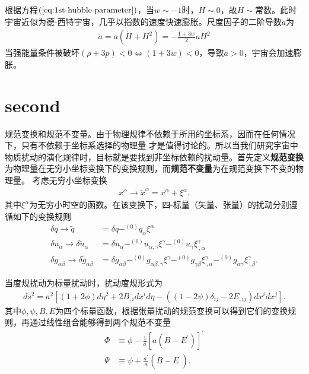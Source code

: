 \documentclass{article}
\begin{document}
  根据方程$(\ref{eq:1st-hubble-parameter})$，当$w\sim -1$时，$\dot{H}\sim
  0$，故$H\sim
  \text{常数}$。此时宇宙近似为德-西特宇宙，几乎以指数的速度快速膨胀。尺度因子的二阶导数$\ddot{a}$为
  \begin{align}
    \label{eq:2nd-scale-factor}
    \ddot{a}=a{\left(\dot{H}+H^2\right)}=-\frac{1+3w}{2}aH^2
  \end{align}
  当强能量条件被破坏${\left(\rho+3p\right)}<0\Leftrightarrow
  {\left(1+3w\right)}<0$，导致$\ddot{a}>0$，宇宙会加速膨胀。

\section{second}
  规范变换和规范不变量。由于物理规律不依赖于所用的坐标系，因而在任何情况下，只有不依赖于坐标系选择的物理量
  才是值得讨论的。所以当我们研究宇宙中物质扰动的演化规律时，目标就是要找到非坐标依赖的扰动量。首先定义\textbf{规范变换}为物理量在无穷小坐标变换下的变换规则，而\textbf{规范不变量}为在规范变换下不变的物理量。
  考虑无穷小坐标变换
  \begin{align}
    \label{eq:coordinate-transformation}
    x^{\alpha}\rightarrow \tilde{x}^{\alpha}=x^{\alpha} + \xi^{\alpha}.
  \end{align}
  其中$\xi^{\alpha}$为无穷小时空的函数。在该变换下，四-标量（矢量、张量）的扰动分别遵循如下的变换规则
  \begin{align}
    \label{eq:gauge-transformation-scalar}
    \delta{q} \rightarrow \tilde{q} &=\delta{q}-^{(0)}q_{\alpha}\xi^{\alpha} \\
    \label{eq:gauge-transformation-vector}
    \delta{u}_{\alpha}\rightarrow \delta{\tilde{u}}_{\alpha}&=
    \delta{u}_{\alpha}-^{(0)}u_{\alpha,\gamma}\xi^{\gamma}-^{(0)}u_{\gamma}\xi^{\gamma}_{\
    ,\alpha} \\
    \label{eq:gauge-transformation-tensor}
    \delta{g_{\alpha\beta}}\rightarrow \delta{\tilde{g}_{\alpha\beta}} &=
    \delta{g_{\alpha\beta}}-^{(0)}g_{\alpha\beta,\gamma}\xi^{\gamma}-^{(0)}g_{\gamma\beta}\xi^{\gamma}_{\
    ,\alpha}-^{(0)}g_{\alpha\gamma}\xi^{\gamma}_{\ ,\beta}.
  \end{align}
  
  当度规扰动为标量扰动时，扰动度规形式为
  \begin{align}
    \label{eq:scalar-perturbation-metric}
    ds^2=a^2{\left[(1+2\phi)d\eta^2+2B_{,i}dx^{i}d\eta-{\left((1-2\psi)\delta_{ij}-2E_{,ij}\right)}dx^{i}dx^{j}\right]}.
  \end{align}
  其中$\phi, \psi, B,
  E$为四个标量函数，根据张量扰动的规范变换可以得到它们的变换规则，再通过线性组合能够得到两个规范不变量
  \begin{equation}
    \begin{split}
      \label{eq:gauge-invariant-varible}
      \Phi &\equiv\phi-\frac{1}{a}{\left[a{\left(B-E^\prime\right)}\right]}^{\prime}\\
      \Psi &\equiv \psi+ \frac{a^\prime}{a}{\left(B-E^\prime\right)}.
    \end{split}
  \end{equation}
  
\end{document}
